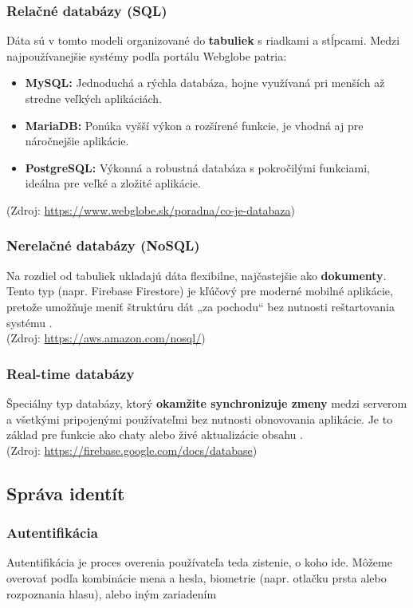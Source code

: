 \subsubsection{Relačné databázy (SQL)}
Dáta sú v tomto modeli organizované do \textbf{tabuliek} s riadkami a stĺpcami. Medzi najpoužívanejšie systémy podľa portálu Webglobe \cite{webglobe_databaza} patria:
\begin{itemize}
    \item \textbf{MySQL:} Jednoduchá a rýchla databáza, hojne využívaná pri menších až stredne veľkých aplikáciách.
    \item \textbf{MariaDB:} Ponúka vyšší výkon a rozšírené funkcie, je vhodná aj pre náročnejšie aplikácie.
    \item \textbf{PostgreSQL:} Výkonná a robustná databáza s pokročilými funkciami, ideálna pre veľké a zložité aplikácie.
\end{itemize}

(Zdroj: \url{https://www.webglobe.sk/poradna/co-je-databaza})

\subsubsection{Nerelačné databázy (NoSQL)}
Na rozdiel od tabuliek ukladajú dáta flexibilne, najčastejšie ako \textbf{dokumenty}. Tento typ (napr. Firebase Firestore) je kľúčový pre moderné mobilné aplikácie, pretože umožňuje meniť štruktúru dát „za pochodu“ bez nutnosti reštartovania systému \cite{aws_nosql}.
\\ 
(Zdroj: \url{https://aws.amazon.com/nosql/})

\subsubsection{Real-time databázy}
Špeciálny typ databázy, ktorý \textbf{okamžite synchronizuje zmeny} medzi serverom a všetkými pripojenými používateľmi bez nutnosti obnovovania aplikácie. Je to základ pre funkcie ako chaty alebo živé aktualizácie obsahu \cite{firebase_db}.
\\ (Zdroj: \url{https://firebase.google.com/docs/database})

 \fi
\subsection{Správa identít}
\subsubsection{Autentifikácia}
Autentifikácia je proces overenia používateľa teda zistenie, o koho ide. Môžeme overovať podľa kombinácie mena a hesla,
biometrie (napr. otlačku prsta alebo rozpoznania hlasu), alebo iným zariadením 

